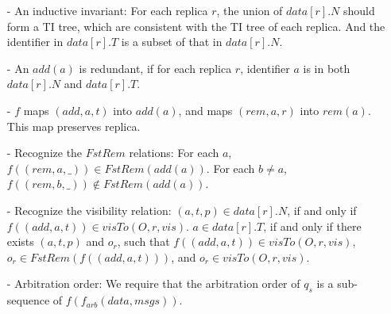 \begin{itemize}
\setlength{\itemsep}{0.5pt}
\item[-] An inductive invariant: For each replica $r$, the union of $\mathit{data}[r].N$ should form a TI tree, which are consistent with the TI tree of each replica. And the identifier in $\mathit{data}[r].T$ is a subset of that in $\mathit{data}[r].N$.

\item[-] An $\mathit{add}(a)$ is redundant, if for each replica $r$, identifier $a$ is in both $\mathit{data}[r].N$ and $\mathit{data}[r].T$. 

\item[-] $f$ maps $(\mathit{add},a,t)$ into $\mathit{add}(a)$, and maps $(\mathit{rem},a,r)$ into $\mathit{rem}(a)$. This map preserves replica. 

\item[-] Recognize the $\mathit{FstRem}$ relations: For each $a$, $f((\mathit{rem},a,\_)) \in \mathit{FstRem}(\mathit{add}(a))$. For each $b \neq a$, $f((\mathit{rem},b,\_)) \notin \mathit{FstRem}(\mathit{add}(a))$. 

\item[-] Recognize the visibility relation: $(a,t,p) \in \mathit{data}[r].N$, if and only if $f((\mathit{add},a,t)) \in \mathit{visTo}(O,r,\mathit{vis})$. $a \in \mathit{data}[r].T$, if and only if there exists $(a,t,p)$ and $o_r$, such that $f((\mathit{add},a,t)) \in \mathit{visTo}(O,r,\mathit{vis})$, $o_r \in \mathit{FstRem}(f((\mathit{add},a,t)))$, and $o_r \in \mathit{visTo}(O,r,\mathit{vis})$. 

\item[-] Arbitration order: We require that the arbitration order of $q_s$ is a sub-sequence of $f(f_{\mathit{arb}}(data,msgs))$.
\end{itemize}























































